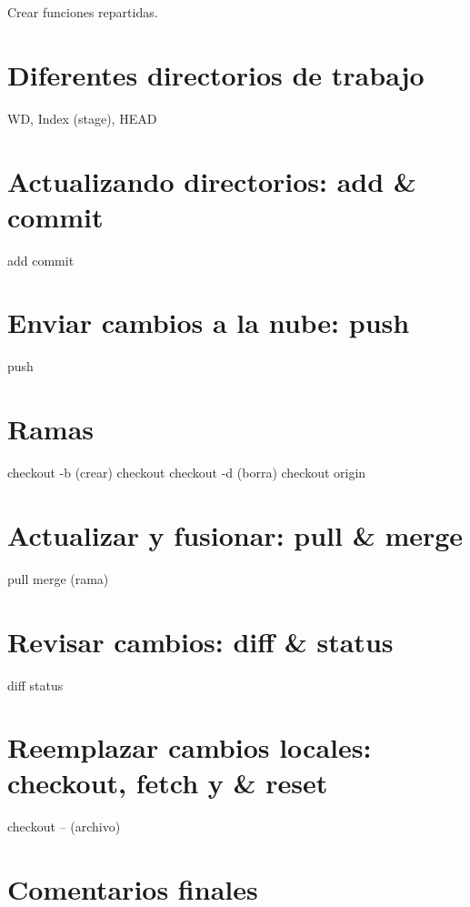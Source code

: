 \documentclass[10pt,letterpaper]{article}
\begin{document}
Crear funciones repartidas.

\section{Diferentes directorios de trabajo}
WD, Index (stage), HEAD

\section{Actualizando directorios: add \& commit}
add
commit

\section{Enviar cambios a la nube: push}
push

\section{Ramas}
checkout -b (crear)
checkout
checkout -d (borra)
checkout origin

\section{Actualizar y fusionar: pull \& merge}
pull
merge (rama)

\section{Revisar cambios: diff \& status}
diff
status

\section{Reemplazar cambios locales: checkout, fetch y \& reset}
checkout -- (archivo)

\section{Comentarios finales}

\newpage
\end{document}
